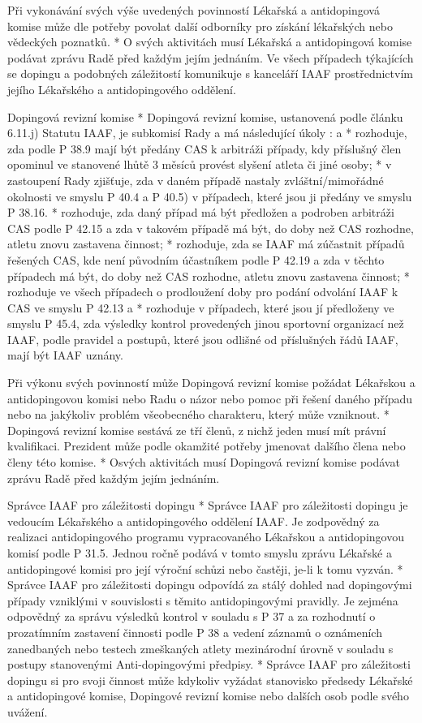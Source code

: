 Při vykonávání svých výše uvedených povinností Lékařská a antidopingová komise může dle potřeby povolat další odborníky pro získání lékařských nebo vědeckých poznatků.
* O svých aktivitách musí Lékařská a antidopingová komise podávat zprávu Radě před každým jejím jednáním. Ve všech případech týkajících se dopingu a podobných záležitostí komunikuje s kanceláří IAAF prostřednictvím jejího Lékařského a antidopingového oddělení.

Dopingová revizní komise
* Dopingová revizní komise, ustanovená podle článku 6.11.j) Statutu IAAF, je subkomisí Rady a má následující úkoly :
  \begitems \style a
  * rozhoduje, zda podle P 38.9 mají být předány CAS k arbitráži případy, kdy příslušný člen opominul ve stanovené lhůtě 3 měsíců provést slyšení atleta či jiné osoby;
  * v zastoupení Rady zjišťuje, zda v daném případě nastaly zvláštní/mimořádné okolnosti ve smyslu P 40.4 a P 40.5) v případech, které jsou ji předány ve smyslu P 38.16.
  * rozhoduje, zda daný případ má být předložen a podroben arbitráži CAS podle P 42.15 a zda v takovém případě má být, do doby než CAS rozhodne, atletu znovu zastavena činnost;
  * rozhoduje, zda se IAAF má zúčastnit případů řešených CAS, kde není původním účastníkem podle P 42.19 a zda v těchto případech má být, do doby než CAS rozhodne, atletu znovu zastavena činnost;
  * rozhoduje ve všech případech o prodloužení doby pro podání odvolání IAAF k CAS ve smyslu P 42.13 a
  * rozhoduje v případech, které jsou jí předloženy ve smyslu P 45.4, zda výsledky kontrol provedených jinou sportovní organizací než IAAF, podle pravidel a postupů, které jsou odlišné od příslušných řádů IAAF, mají být IAAF uznány.
  \enditems

Při výkonu svých povinností může Dopingová revizní komise požádat Lékařskou a antidopingovou komisi nebo Radu o názor nebo pomoc při řešení daného případu nebo na jakýkoliv problém všeobecného charakteru, který může vzniknout.
* Dopingová revizní komise sestává ze tří členů, z nichž jeden musí mít právní kvalifikaci. Prezident může podle okamžité potřeby jmenovat dalšího člena nebo členy této komise.
* Osvých aktivitách musí Dopingová revizní komise podávat zprávu Radě před každým jejím jednáním.

Správce IAAF pro záležitosti dopingu
* Správce IAAF pro záležitosti dopingu je vedoucím Lékařského a antidopingového oddělení IAAF. Je zodpovědný za realizaci antidopingového programu vypracovaného Lékařskou a antidopingovou komisí podle P 31.5. Jednou ročně podává v tomto smyslu zprávu Lékařské a antidopingové komisi pro její výroční schůzi nebo častěji, je-li k tomu vyzván.
* Správce IAAF pro záležitosti dopingu odpovídá za stálý dohled nad dopingovými případy vzniklými v souvislosti s těmito antidopingovými pravidly. Je zejména odpovědný za správu výsledků kontrol v souladu s P 37 a za rozhodnutí o prozatímním zastavení činnosti podle P 38 a vedení záznamů o  oznámeních zanedbaných nebo testech zmeškaných atlety mezinárodní úrovně v souladu s postupy stanovenými Anti-dopingovými předpisy.
* Správce IAAF pro záležitosti dopingu si pro svoji činnost může kdykoliv vyžádat stanovisko předsedy Lékařské a antidopingové komise, Dopingové revizní komise nebo dalších osob podle svého uvážení.
\enditems

